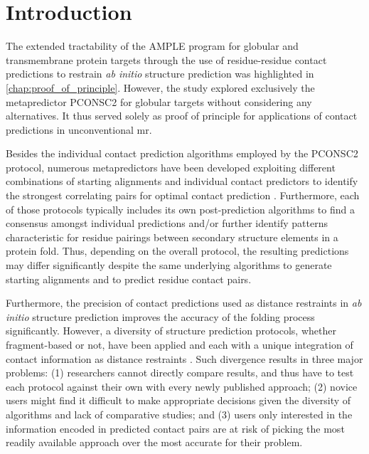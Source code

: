 \section{Introduction}
The extended tractability of the AMPLE program for globular and transmembrane protein targets through the use of residue-residue contact predictions to restrain \textit{ab initio} structure prediction was highlighted in \cref{chap:proof_of_principle}. However, the study explored exclusively the metapredictor PCONSC2 for globular targets without considering any alternatives. It thus served solely as proof of principle for applications of contact predictions in unconventional \gls{mr}.

Besides the individual contact prediction algorithms employed by the PCONSC2 protocol, numerous metapredictors have been developed exploiting different combinations of starting alignments and individual contact predictors to identify the strongest correlating pairs for optimal contact prediction \cite{Kamisetty2013-le,Skwark2014-qp,Jones2015-vq,Ma2015-vo,He2017-fn,Michel2017-pm,Wang2017-rx}. Furthermore, each of those protocols typically includes its own post-prediction algorithms to find a consensus amongst individual predictions and/or further identify patterns characteristic for residue pairings between secondary structure elements in a protein fold. Thus, depending on the overall protocol, the resulting predictions may differ significantly despite the same underlying algorithms to generate starting alignments and to predict residue contact pairs.

Furthermore, the precision of contact predictions used as distance restraints in \textit{ab initio} structure prediction improves the accuracy of the folding process significantly. However, a diversity of structure prediction protocols, whether fragment-based or not, have been applied and each with a unique integration of contact information as distance restraints \cite{Marks2011-os,Michel2014-eg,Adhikari2015-lb,Jones2015-vq,Ovchinnikov2015-tn,Adhikari2018-lj}. Such divergence results in three major problems: (1) researchers cannot directly compare results, and thus have to test each protocol against their own with every newly published approach; (2) novice users might find it difficult to make appropriate decisions given the diversity of algorithms and lack of comparative studies; and (3) users only interested in the information encoded in predicted contact pairs are at risk of picking the most readily available approach over the most accurate for their problem.

